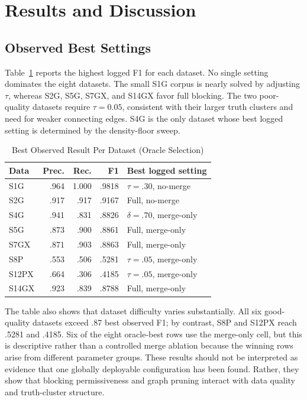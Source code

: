 \documentclass[conference]{IEEEtran}
\begin{document}
\section{Results and Discussion}
\subsection{Observed Best Settings}
Table~\ref{tab:best} reports the highest logged F1 for each dataset. No single setting dominates the eight datasets. The small S1G corpus is nearly solved by adjusting $\tau$, whereas S2G, S5G, S7GX, and S14GX favor full blocking. The two poor-quality datasets require $\tau=0.05$, consistent with their larger truth clusters and need for weaker connecting edges. S4G is the only dataset whose best logged setting is determined by the density-floor sweep.

\begin{table}[t]
\caption{Best Observed Result Per Dataset (Oracle Selection)}
\label{tab:best}
\centering
\scriptsize
\setlength{\tabcolsep}{3.2pt}
\begin{tabular}{lrrrl}
\toprule
Data & Prec. & Rec. & F1 & Best logged setting \\
\midrule
S1G   & .964 & 1.000 & .9818 & $\tau=.30$, no-merge \\
S2G   & .917 & .917  & .9167 & Full, no-merge \\
S4G   & .941 & .831  & .8826 & $\delta=.70$, merge-only \\
S5G   & .873 & .900  & .8861 & Full, merge-only \\
S7GX  & .871 & .903  & .8863 & Full, merge-only \\
S8P   & .553 & .506  & .5281 & $\tau=.05$, merge-only \\
S12PX & .664 & .306  & .4185 & $\tau=.05$, merge-only \\
S14GX & .923 & .839  & .8788 & Full, merge-only \\
\bottomrule
\end{tabular}
\end{table}

The table also shows that dataset difficulty varies substantially. All six good-quality datasets exceed .87 best observed F1; by contrast, S8P and S12PX reach .5281 and .4185. Six of the eight oracle-best rows use the merge-only cell, but this is descriptive rather than a controlled merge ablation because the winning rows arise from different parameter groups. These results should not be interpreted as evidence that one globally deployable configuration has been found. Rather, they show that blocking permissiveness and graph pruning interact with data quality and truth-cluster structure.
\end{document}
